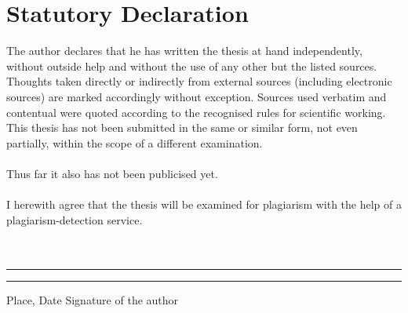 \documentclass[a4paper, 11pt, twoside]{article}
\newcommand{\mainmatter}{
	\cleardoublepage
	\pagenumbering{arabic}
	\setcounter{page}{1}
}
\newcommand{\schlussmatter}{
	\cleardoublepage
	\pagenumbering{Roman}
	\setcounter{page}{6}
}
\begin{document}
\setcounter{secnumdepth}{4}

\mainmatter
\newpage
\acresetall
\cleardoublepage


\newpage
\acresetall
\cleardoublepage


\newpage
\acresetall
\cleardoublepage


\newpage
\acresetall
\cleardoublepage


\newpage
\acresetall
\cleardoublepage


\newpage
\cleardoublepage



\newpage
\cleardoublepage


\schlussmatter
\newpage
{}
\printbibliography

\newpage
\cleardoublepage
\section*{Statutory Declaration}
\thispagestyle{empty}
The author declares that he has written the thesis at hand independently, without outside help and without the use of any other but the listed sources. Thoughts taken directly or indirectly from external sources (including electronic sources) are marked accordingly without exception. Sources used verbatim and contentual were quoted according to the recognised rules for scientific working. This thesis has not been submitted in the same or similar form, not even partially, within the scope of a different examination.\\\\
Thus far it also has not been publicised yet.\\\\
I herewith agree that the thesis will be examined for plagiarism with the help of a plagiarism-detection service.\\\\\\
\noindent\rule{5cm}{.4pt}\hfill\rule{5cm}{.4pt}\par
\noindent Place, Date \hfill Signature of the author
\end{document}
